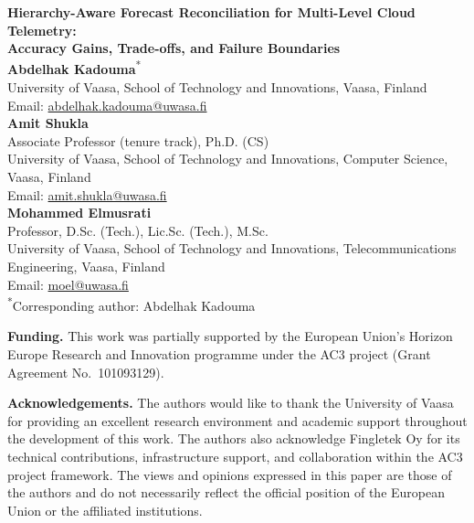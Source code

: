\documentclass[11pt,a4paper]{article}
\begin{document}
\begin{center}
{\Large\bfseries Hierarchy-Aware Forecast Reconciliation for Multi-Level Cloud Telemetry:\\
Accuracy Gains, Trade-offs, and Failure Boundaries}\\[1.5em]
{\large
\textbf{Abdelhak Kadouma}\textsuperscript{*}\\[0.35em]
{\normalsize University of Vaasa, School of Technology and Innovations, Vaasa, Finland}\\
{\normalsize Email: \href{mailto:abdelhak.kadouma@uwasa.fi}{abdelhak.kadouma@uwasa.fi}}\\[0.9em]

\textbf{Amit Shukla}\\[0.35em]
{\normalsize Associate Professor (tenure track), Ph.D. (CS)}\\
{\normalsize University of Vaasa, School of Technology and Innovations, Computer Science, Vaasa, Finland}\\
{\normalsize Email: \href{mailto:amit.shukla@uwasa.fi}{amit.shukla@uwasa.fi}}\\[0.9em]

\textbf{Mohammed Elmusrati}\\[0.35em]
{\normalsize Professor, D.Sc. (Tech.), Lic.Sc. (Tech.), M.Sc.}\\
{\normalsize University of Vaasa, School of Technology and Innovations, Telecommunications Engineering, Vaasa, Finland}\\
{\normalsize Email: \href{mailto:moel@uwasa.fi}{moel@uwasa.fi}}\\[0.9em]
}
\textsuperscript{*}Corresponding author: Abdelhak Kadouma
\end{center}

\vspace{1.5em}
\noindent\textbf{Funding.}
This work was partially supported by the European Union's Horizon Europe
Research and Innovation programme under the AC3 project
(Grant Agreement No.~101093129).

\vspace{1em}
\noindent\textbf{Acknowledgements.}
The authors would like to thank the University of Vaasa for providing an
excellent research environment and academic support throughout the development
of this work. The authors also acknowledge Fingletek Oy for its technical
contributions, infrastructure support, and collaboration within the AC3 project
framework. The views and opinions expressed in this paper are those of the
authors and do not necessarily reflect the official position of the European
Union or the affiliated institutions.
\end{document}
